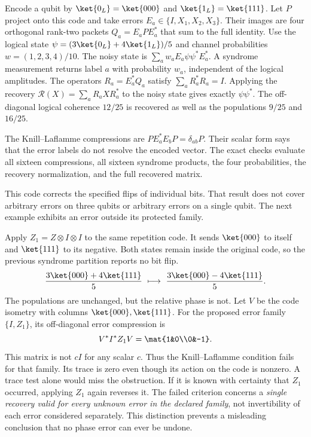 Encode a qubit by $\ket{0_L}=\ket{000}$ and $\ket{1_L}=\ket{111}$. Let $P$ project onto this code and take errors $E_a\in\{I,X_1,X_2,X_3\}$. Their images are four orthogonal rank-two packets $Q_a=E_aPE_a^*$ that sum to the full identity.
Use the logical state $\psi=(3\ket{0_L}+4\ket{1_L})/5$ and channel probabilities $w=(1,2,3,4)/10$. The noisy state is $\sum_aw_aE_a\psi\psi^*E_a^*$. A syndrome measurement returns label $a$ with probability $w_a$, independent of the logical amplitudes.
The operators $R_a=E_a^*Q_a$ satisfy $\sum_aR_a^*R_a=I$. Applying the recovery $\mathcal R(X)=\sum_aR_aXR_a^*$ to the noisy state gives exactly $\psi\psi^*$. The off-diagonal logical coherence $12/25$ is recovered as well as the populations $9/25$ and $16/25$.

The Knill--Laflamme compressions are $PE_a^*E_bP=\delta_{ab}P$. Their scalar form says that the error labels do not resolve the encoded vector. The exact checks evaluate all sixteen compressions, all sixteen syndrome products, the four probabilities, the recovery normalization, and the full recovered matrix.

This code corrects the specified flips of individual bits. That result does not cover arbitrary errors on three qubits or arbitrary errors on a single qubit. The next example exhibits an error outside its protected family.

Apply $Z_1=Z\otimes I\otimes I$ to the same repetition code. It sends $\ket{000}$ to itself and $\ket{111}$ to its negative. Both states remain inside the original code, so the previous syndrome partition reports no bit flip.
\[
\frac{3\ket{000}+4\ket{111}}5
\ \longmapsto\
\frac{3\ket{000}-4\ket{111}}5.
\]
The populations are unchanged, but the relative phase is not.
Let $V$ be the code isometry with columns $\ket{000},\ket{111}$. For the proposed error family $\{I,Z_1\}$, its off-diagonal error compression is
\[
V^*I^*Z_1V=\mat{1&0\\0&-1}.
\]
This matrix is not $cI$ for any scalar $c$. Thus the Knill--Laflamme condition fails for that family. Its trace is zero even though its action on the code is nonzero. A trace test alone would miss the obstruction.
\head{Known correction versus family recovery}
If it is known with certainty that $Z_1$ occurred, applying $Z_1$ again reverses it. The failed criterion concerns a \emph{single recovery valid for every unknown error in the declared family}, not invertibility of each error considered separately. This distinction prevents a misleading conclusion that no phase error can ever be undone.

